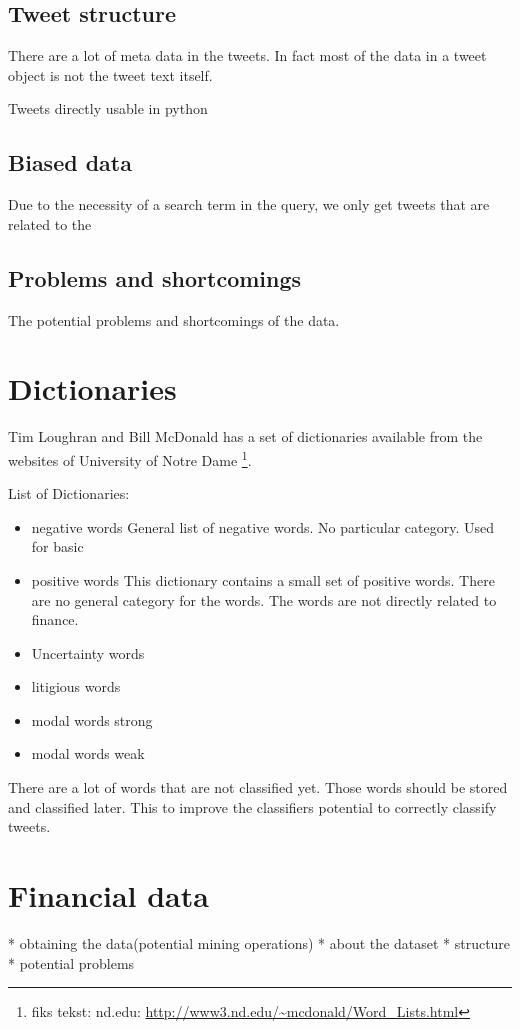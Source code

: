 \subsection{Tweet structure}
There are a lot of meta data in the tweets. In fact most of the data in a tweet
object is not the tweet text itself.  

Tweets directly usable in python 

\subsection{Biased data}
Due to the necessity of a search term in the query, we only get tweets that are
related to the 

\subsection{Problems and shortcomings}
The potential problems and shortcomings of the data. 


\section{Dictionaries}\label{sec:dict}

Tim Loughran and Bill McDonald has a set of dictionaries available from the
websites of University of Notre Dame \footnote{fiks tekst: nd.edu:
\url{http://www3.nd.edu/~mcdonald/Word_Lists.html}}. 

List of Dictionaries:
\begin{itemize}
    \item negative words
General list of negative words. No particular category. Used for basic   
    \item positive words
This dictionary contains a small set of positive words. There are no general
category for the words. The words are not directly related to finance. 
    \item Uncertainty words
    \item litigious words
    \item modal words strong
    \item modal words weak
\end{itemize}

There are a lot of words that are not classified yet. Those words should be
stored and classified later. This to improve the classifiers potential to
correctly classify tweets.  

\section{Financial data}
* obtaining the data(potential mining operations)
* about the dataset  
* structure
* potential problems 
